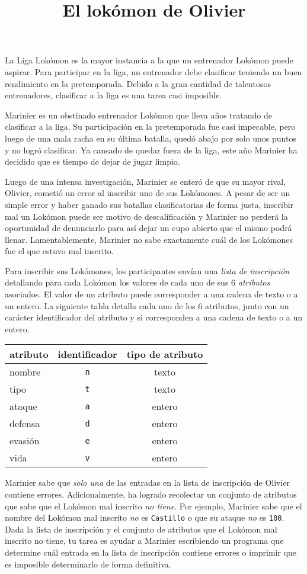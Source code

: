 \documentclass{oci}
\title{El lokómon de Olivier}
\begin{document}
\begin{problemDescription}
La Liga Lokómon es la mayor instancia a la que un entrenador Lokómon puede aspirar.
Para participar en la liga, un entrenador debe clasificar teniendo un buen
rendimiento en la pretemporada.
Debido a la gran cantidad de talentosos entrenadores, clasificar a la liga
es una tarea casi imposible.

Marinier es un obstinado entrenador Lokómon que lleva años tratando de clasificar a la liga.
Su participación en la pretemporada fue casi impecable, pero luego de una mala racha
en su última batalla, quedó abajo por solo unos puntos y no logró clasificar.
Ya cansado de quedar fuera de la liga, este año Marinier ha decidido que es tiempo
de dejar de jugar limpio.

Luego de una intensa investigación, Marinier se enteró de que su mayor rival, Olivier, cometió
un error al inscribir uno de sus Lokómones.
A pesar de ser un simple error y haber ganado sus batallas clasificatorias de
forma justa, inscribir mal un Lokómon puede ser motivo de descalificación y
Marinier no perderá la oportunidad de denunciarlo para así dejar un cupo abierto
que el mismo podrá llenar.
Lamentablemente, Marinier no sabe exactamente cuál de los Lokómones fue el que
estuvo mal inscrito.

Para inscribir sus Lokómones, los participantes envían una \emph{lista de inscripción}
detallando para cada Lokómon los valores de cada uno de sus 6 \emph{atributos} asociados.
El valor de un atributo puede corresponder a una cadena de texto o a un entero.
La siguiente tabla detalla cada uno de los 6 atributos, junto con un carácter identificador
del atributo y si corresponden a una cadena de texto o a un entero.
\begin{center}
\begin{tabular}{lcc}
	\toprule
	\textbf{atributo} & \textbf{identificador} & \textbf{tipo de atributo} \\
	\midrule
	{nombre } & \texttt{n} & texto \\
	{tipo   } & \texttt{t} & texto \\
	{ataque } & \texttt{a} & entero \\
	{defensa} & \texttt{d} & entero \\
	{evasión} & \texttt{e} & entero \\
	{vida   } & \texttt{v} & entero\\
	\bottomrule
\end{tabular}
\end{center}

Marinier sabe que \emph{solo una} de las entradas en la lista de inscripción
de Olivier contiene errores.
Adicionalmente, ha logrado recolectar un conjunto de atributos que sabe que el Lokómon
mal inscrito \emph{no tiene}.
Por ejemplo, Marinier sabe que el nombre del Lokómon mal inscrito \emph{no} es \texttt{Castillo}
o que su ataque \emph{no} es \texttt{100}.
Dada la lista de inscripción y el conjunto de atributos que el Lokómon
mal inscrito no tiene, tu tarea es ayudar a Marinier escribiendo un programa que determine
cuál entrada en la lista de inscripción contiene errores o imprimir que es imposible
determinarlo de forma definitiva.
\end{problemDescription}
\end{document}

